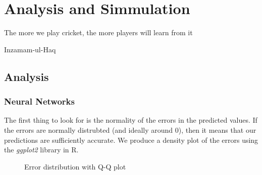 \chapter{Analysis and Simmulation}

\epigraph{The more we play cricket, the more players will learn from it}{Inzamam-ul-Haq}

\section{Analysis}
\subsection{Neural Networks}
The first thing to look for is the normality of the errors in the predicted values. If the errors are normally distrubted (and ideally around 0),
then it means that our predictions are sufficiently accurate. We produce a density plot of the errors using the \textit{ggplot2} library in R.

\begin{figure}[h]
    \centering
    \qquad
    \caption{Error distribution with Q-Q plot}
    \label{errDistAndQQ}
\end{figure}

